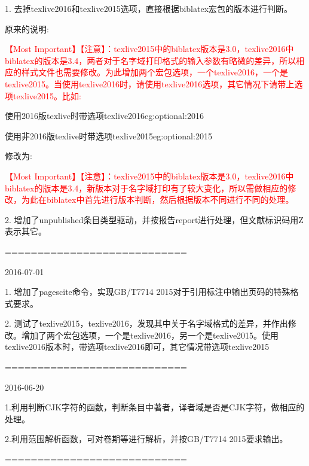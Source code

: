 \documentclass[11pt]{article} %
\begin{document}
1. 去掉texlive2016和texlive2015选项，直接根据biblatex宏包的版本进行判断。

原来的说明:
\begin{texlist}
    \textcolor{red}{\HandRight \heiti 【Most Important】【注意】：texlive2015中的biblatex版本是3.0，texlive2016中biblatex的版本是3.4，两者对于名字域打印格式的输入参数有略微的差异，所以相应的样式文件也需要修改。为此增加两个宏包选项，一个texlive2016，一个是texlive2015。当使用texlive2016时，请使用texlive2016选项，其它情况下请带上选项texlive2015。比如:}

    \begin{codetex}{使用2016版texlive时带选项texlive2016}{eg:optional:2016}
    \usepackage[backend=biber,texlive2016,style=gb7714_2015]{biblatex}
    \end{codetex}

    \begin{codetex}{使用非2016版texlive时带选项texlive2015}{eg:optional:2015}
    \usepackage[backend=biber,texlive2015,style=gb7714_2015]{biblatex}
    \end{codetex}
\end{texlist}

修改为:
\begin{texlist}
    \textcolor{red}{\HandRight \heiti 【Most Important】【注意】：texlive2015中的biblatex版本是3.0，texlive2016中biblatex的版本是3.4，新版本对于名字域打印有了较大变化，所以需做相应的修改，为此在biblatex中首先进行版本判断，然后根据版本不同进行不同的处理。}
\end{texlist}

2. 增加了unpublished条目类型驱动，并按报告report进行处理，但文献标识码用Z表示其它。

============================

2016-07-01

1. 增加了pagescite命令，实现GB/T7714 2015对于引用标注中输出页码的特殊格式要求。

2. 测试了texlive2015，texlive2016，发现其中关于名字域格式的差异，并作出修改。增加了两个宏包选项，一个是texlive2016，另一个是texlive2015。使用texlive2016版本时，带选项texlive2016即可，其它情况带选项texlive2015

============================

2016-06-20

1.利用判断CJK字符的函数，判断条目中著者，译者域是否是CJK字符，做相应的处理。

2.利用范围解析函数，可对卷期等进行解析，并按GB/T7714 2015要求输出。


============================
\end{document}
